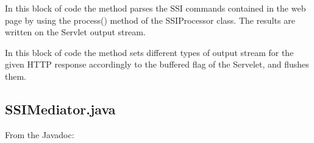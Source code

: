 \documentclass[11pt,titlepage]{article} %
\begin{document}
\begin{itemize}
      In this block of code the method parses the SSI commands contained in the web page by using the process() method of the SSIProcessor class.
      The results are written on the Servlet output stream.\newline
      
      \newline


      In this block of code the method sets different types of output stream for the given HTTP response accordingly to the buffered flag of the Servelet,
      and flushes them.

      
      \newline

  \end{itemize}

\subsection{SSIMediator.java}
  From the Javadoc:

  
\end{document}
